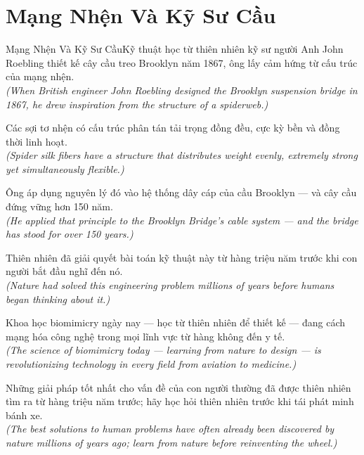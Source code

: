 \section{Mạng Nhện Và Kỹ Sư Cầu}
\begin{truyen}{Mạng Nhện Và Kỹ Sư Cầu}{Kỹ thuật học từ thiên nhiên}
 kỹ sư người Anh John Roebling thiết kế cây cầu treo Brooklyn năm 1867, ông lấy cảm hứng từ cấu trúc của mạng nhện.\\[4pt]
\textit{(When British engineer John Roebling designed the Brooklyn suspension bridge in 1867, he drew inspiration from the structure of a spiderweb.)}

Các sợi tơ nhện có cấu trúc phân tán tải trọng đồng đều, cực kỳ bền và đồng thời linh hoạt.\\[4pt]
\textit{(Spider silk fibers have a structure that distributes weight evenly, extremely strong yet simultaneously flexible.)}

Ông áp dụng nguyên lý đó vào hệ thống dây cáp của cầu Brooklyn --- và cây cầu đứng vững hơn 150 năm.\\[4pt]
\textit{(He applied that principle to the Brooklyn Bridge's cable system --- and the bridge has stood for over 150 years.)}

Thiên nhiên đã giải quyết bài toán kỹ thuật này từ hàng triệu năm trước khi con người bắt đầu nghĩ đến nó.\\[4pt]
\textit{(Nature had solved this engineering problem millions of years before humans began thinking about it.)}

Khoa học biomimicry ngày nay --- học từ thiên nhiên để thiết kế --- đang cách mạng hóa công nghệ trong mọi lĩnh vực từ hàng không đến y tế.\\[4pt]
\textit{(The science of biomimicry today --- learning from nature to design --- is revolutionizing technology in every field from aviation to medicine.)}

\end{truyen}
\begin{baihoc}
  Những giải pháp tốt nhất cho vấn đề của con người thường đã được thiên nhiên tìm ra từ hàng triệu năm trước; hãy học hỏi thiên nhiên trước khi tái phát minh bánh xe.\\[4pt]
  \textit{(The best solutions to human problems have often already been discovered by nature millions of years ago; learn from nature before reinventing the wheel.)}
\end{baihoc}


